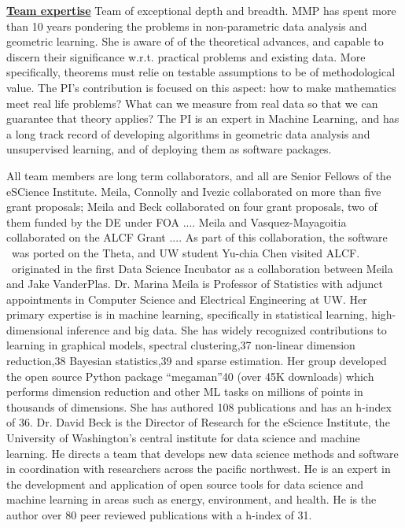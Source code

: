 \documentclass[floatfix,11pt]{revtex4}
\begin{document}
\underline{\bf Team expertise} Team of exceptional depth and breadth.
MMP has spent more than 10 years pondering the problems in non-parametric data analysis and geometric learning. She is aware of of the theoretical advances, and capable to discern their significance w.r.t. practical problems and existing data. More specifically, theorems must relie on testable assumptions to be of methodological value. The PI's contribution is focused on this aspect: how to make mathematics meet real life problems? What can we measure from real data so that we can guarantee that theory applies?
The PI is an expert in Machine Learning, and has a long track record of developing algorithms in geometric data analysis and unsupervised learning, and of deploying them as software packages.

All team members are long term collaborators, and all are Senior Fellows of the eSCience Institute. Meila, Connolly and Ivezic collaborated on more than five grant proposals; Meila and Beck collaborated on four grant proposals, two of them funded by the DE under FOA .... Meila and Vasquez-Mayagoitia collaborated on the ALCF Grant .... As part of this collaboration, the software \mmani~was ported on the Theta, and UW student Yu-chia Chen visited ALCF. \mmani~originated in the first Data Science Incubator as a collaboration between Meila and Jake VanderPlas. 
Dr. Marina Meila is Professor of Statistics with adjunct appointments in Computer Science and Electrical Engineering at UW. Her primary expertise is in machine learning, specifically in statistical learning, high-dimensional inference and big data. She has widely recognized contributions to learning in graphical models, spectral clustering,37 non-linear dimension reduction,38 Bayesian statistics,39 and sparse estimation. Her group developed the open source Python package “megaman”40 (over 45K downloads) which performs dimension reduction and other ML tasks on millions of points in thousands of dimensions. She has authored 108 publications and has an h-index of 36.
Dr. David Beck is the Director of Research for the eScience Institute, the University of Washington’s central institute for data science and machine learning. He directs a team that develops new data science methods and software in coordination with researchers across the pacific northwest. He is an expert in the development and application of open source tools for data science and machine learning in areas such as energy, environment, and health. He is the author over 80 peer reviewed publications with a h-index of 31.
\end{document}
